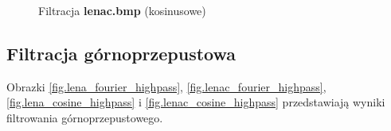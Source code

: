 \documentclass{classrep}
\begin{document}
\begin{figure}
{  \label{fig.lenac_cosine_lowpass_0_5}
 }
\caption{Filtracja \textbf{lenac.bmp} (kosinusowe)}
\label{fig.lenac_cosine_lowpass}
\end{figure}

\subsection{Filtracja górnoprzepustowa}
Obrazki \ref{fig.lena_fourier_highpass}, \ref{fig.lenac_fourier_highpass}, \ref{fig.lena_cosine_highpass} i \ref{fig.lenac_cosine_highpass} przedstawiają wyniki filtrowania górnoprzepustowego.
\end{document}
